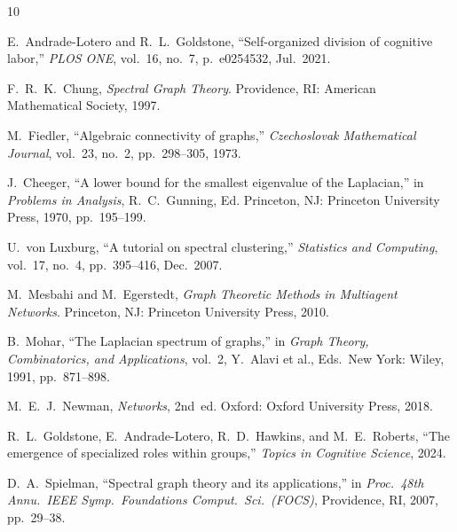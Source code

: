 \documentclass[journal]{IEEEtran}
\begin{document}

\begin{thebibliography}{10}

E.\ Andrade-Lotero and R.\ L.\ Goldstone,
``Self-organized division of cognitive labor,''
\textit{PLOS ONE}, vol.~16, no.~7, p.~e0254532, Jul.\ 2021.

F.\ R.\ K.\ Chung,
\textit{Spectral Graph Theory}.
Providence, RI: American Mathematical Society, 1997.

M.\ Fiedler,
``Algebraic connectivity of graphs,''
\textit{Czechoslovak Mathematical Journal}, vol.~23, no.~2, pp.~298--305, 1973.

J.\ Cheeger,
``A lower bound for the smallest eigenvalue of the Laplacian,''
in \textit{Problems in Analysis}, R.\ C.\ Gunning, Ed.
Princeton, NJ: Princeton University Press, 1970, pp.~195--199.

U.\ von Luxburg,
``A tutorial on spectral clustering,''
\textit{Statistics and Computing}, vol.~17, no.~4, pp.~395--416, Dec.\ 2007.

M.\ Mesbahi and M.\ Egerstedt,
\textit{Graph Theoretic Methods in Multiagent Networks}.
Princeton, NJ: Princeton University Press, 2010.

B.\ Mohar,
``The Laplacian spectrum of graphs,''
in \textit{Graph Theory, Combinatorics, and Applications}, vol.~2,
Y.\ Alavi et al., Eds.\ New York: Wiley, 1991, pp.~871--898.

M.\ E.\ J.\ Newman,
\textit{Networks}, 2nd~ed.
Oxford: Oxford University Press, 2018.

R.\ L.\ Goldstone, E.\ Andrade-Lotero, R.\ D.\ Hawkins, and M.\ E.\ Roberts,
``The emergence of specialized roles within groups,''
\textit{Topics in Cognitive Science}, 2024.

D.\ A.\ Spielman,
``Spectral graph theory and its applications,''
in \textit{Proc.\ 48th Annu.\ IEEE Symp.\ Foundations Comput.\ Sci.\ (FOCS)},
Providence, RI, 2007, pp.~29--38.

\end{thebibliography}
\end{document}
